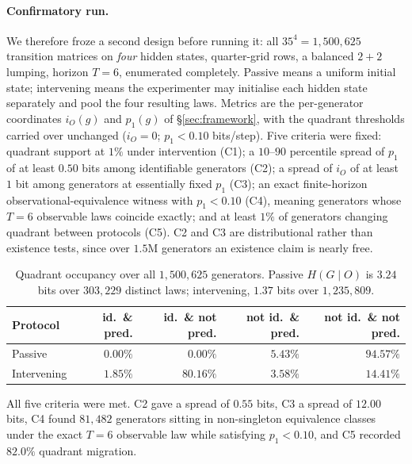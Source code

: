 \documentclass[11pt]{article}
\begin{document}
\paragraph{Confirmatory run.}
We therefore froze a second design before running it: all $35^4 = 1{,}500{,}625$
transition matrices on \emph{four} hidden states, quarter-grid rows, a balanced $2+2$
lumping, horizon $T=6$, enumerated completely. Passive means a uniform initial state;
intervening means the experimenter may initialise each hidden state separately and pool
the four resulting laws. Metrics are the per-generator coordinates $i_O(g)$ and $p_1(g)$ of
\S\ref{sec:framework}, with the quadrant thresholds carried over unchanged
($i_O = 0$; $p_1 < 0.10$ bits/step). Five criteria were fixed: quadrant support at $1\%$
under intervention (C1); a $10$--$90$ percentile spread of $p_1$ of at least $0.50$ bits
among identifiable generators (C2); a spread of $i_O$ of at least $1$ bit among generators
at essentially fixed $p_1$ (C3); an exact finite-horizon observational-equivalence witness with
$p_1<0.10$ (C4), meaning generators whose $T=6$ observable laws coincide exactly; and at least $1\%$ of generators changing quadrant between protocols
(C5). C2 and C3 are distributional rather than existence tests, since over $1.5$M
generators an existence claim is nearly free.

\begin{table}[h]
\centering
\begin{tabular}{lrrrr}
\toprule
Protocol & id.\ \& pred. & id.\ \& not pred. & not id.\ \& pred. & not id.\ \& not pred. \\
\midrule
Passive      & $0.00\%$ & $0.00\%$ & $5.43\%$ & $94.57\%$ \\
Intervening  & $1.85\%$ & $80.16\%$ & $3.58\%$ & $14.41\%$ \\
\bottomrule
\end{tabular}
\caption{Quadrant occupancy over all $1{,}500{,}625$ generators. Passive $H(G\mid O)$ is
$3.24$ bits over $303{,}229$ distinct laws; intervening, $1.37$ bits over $1{,}235{,}809$.}
\end{table}

All five criteria were met. C2 gave a spread of $0.55$ bits, C3 a spread of $12.00$ bits,
C4 found $81{,}482$ generators sitting in non-singleton equivalence classes under the
exact $T=6$ observable law while satisfying $p_1 < 0.10$,
and C5 recorded $82.0\%$ quadrant migration.
\end{document}

